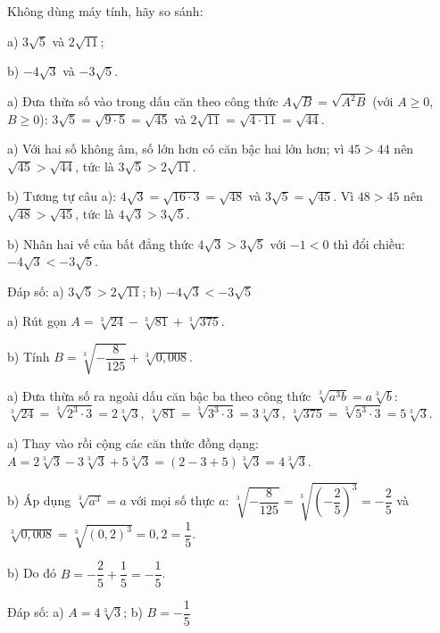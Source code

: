 \begin{problem}[9DS-CAN-035]
Không dùng máy tính, hãy so sánh:

a) $3\sqrt{5}$ và $2\sqrt{11}$;

b) $-4\sqrt{3}$ và $-3\sqrt{5}$.

\begin{solution}
a) Đưa thừa số vào trong dấu căn theo công thức $A\sqrt{B} = \sqrt{A^2 B}$ (với $A \geq 0$, $B \geq 0$): $3\sqrt{5} = \sqrt{9 \cdot 5} = \sqrt{45}$ và $2\sqrt{11} = \sqrt{4 \cdot 11} = \sqrt{44}$.

a) Với hai số không âm, số lớn hơn có căn bậc hai lớn hơn; vì $45 > 44$ nên $\sqrt{45} > \sqrt{44}$, tức là $3\sqrt{5} > 2\sqrt{11}$.

b) Tương tự câu a): $4\sqrt{3} = \sqrt{16 \cdot 3} = \sqrt{48}$ và $3\sqrt{5} = \sqrt{45}$. Vì $48 > 45$ nên $\sqrt{48} > \sqrt{45}$, tức là $4\sqrt{3} > 3\sqrt{5}$.

b) Nhân hai vế của bất đẳng thức $4\sqrt{3} > 3\sqrt{5}$ với $-1 < 0$ thì đổi chiều: $-4\sqrt{3} < -3\sqrt{5}$.

Đáp số: a) $\boxed{3\sqrt{5} > 2\sqrt{11}}$; b) $\boxed{-4\sqrt{3} < -3\sqrt{5}}$
\end{solution}
\end{problem}

\begin{problem}[9DS-CAN-036]
a) Rút gọn $A = \sqrt[3]{24} - \sqrt[3]{81} + \sqrt[3]{375}$.

b) Tính $B = \sqrt[3]{-\dfrac{8}{125}} + \sqrt[3]{0{,}008}$.

\begin{solution}
a) Đưa thừa số ra ngoài dấu căn bậc ba theo công thức $\sqrt[3]{a^3 b} = a\sqrt[3]{b}$: $\sqrt[3]{24} = \sqrt[3]{2^3 \cdot 3} = 2\sqrt[3]{3}$, $\sqrt[3]{81} = \sqrt[3]{3^3 \cdot 3} = 3\sqrt[3]{3}$, $\sqrt[3]{375} = \sqrt[3]{5^3 \cdot 3} = 5\sqrt[3]{3}$.

a) Thay vào rồi cộng các căn thức đồng dạng: $A = 2\sqrt[3]{3} - 3\sqrt[3]{3} + 5\sqrt[3]{3} = (2 - 3 + 5)\sqrt[3]{3} = 4\sqrt[3]{3}$.

b) Áp dụng $\sqrt[3]{a^3} = a$ với mọi số thực $a$: $\sqrt[3]{-\dfrac{8}{125}} = \sqrt[3]{\left(-\dfrac{2}{5}\right)^3} = -\dfrac{2}{5}$ và $\sqrt[3]{0{,}008} = \sqrt[3]{(0{,}2)^3} = 0{,}2 = \dfrac{1}{5}$.

b) Do đó $B = -\dfrac{2}{5} + \dfrac{1}{5} = -\dfrac{1}{5}$.

Đáp số: a) $\boxed{A = 4\sqrt[3]{3}}$; b) $\boxed{B = -\dfrac{1}{5}}$
\end{solution}
\end{problem}

